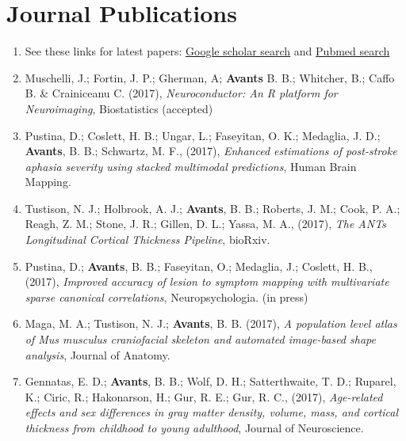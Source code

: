 \documentclass[11pt]{moderncv} %
\begin{document}
\section{Journal Publications} %
\begin{enumerate}
\item See these links for latest papers: \href{https://scholar.google.com/citations?hl=en&user=t4kkowgAAAAJ&view_op=list_works&sortby=pubdate}{Google scholar search} and \href{http://www.ncbi.nlm.nih.gov/pubmed?term=(\%22Avants\%20B\%22)\%20}{Pubmed  search}

\item Muschelli, J.; Fortin, J. P.; Gherman, A; \textbf{Avants} B. B.; Whitcher, B.; Caffo B. \& Crainiceanu C. (2017), \textit{Neuroconductor: An R platform for Neuroimaging}, Biostatistics (accepted)

\item Pustina, D.; Coslett, H. B.; Ungar, L.; Faseyitan, O. K.; Medaglia, J. D.; \textbf{Avants}, B. B.; Schwartz, M. F., (2017), \textit{Enhanced estimations of post-stroke aphasia severity using stacked multimodal predictions}, Human Brain Mapping.

\item Tustison, N. J.; Holbrook, A. J.; \textbf{Avants}, B. B.; Roberts, J. M.; Cook, P. A.; Reagh, Z. M.; Stone, J. R.; Gillen, D. L.; Yassa, M. A., (2017), \textit{The ANTs Longitudinal Cortical Thickness Pipeline}, bioRxiv.

\item Pustina, D.; \textbf{Avants}, B. B.; Faseyitan, O.; Medaglia, J.; Coslett, H. B., (2017), \textit{Improved accuracy of lesion to symptom mapping with multivariate sparse canonical correlations}, Neuropsychologia. (in press)

\item Maga, M. A.; Tustison, N. J.; \textbf{Avants}, B. B. (2017), \textit{A population level atlas of Mus musculus craniofacial skeleton and automated image-based shape analysis}, Journal of Anatomy.

\item Gennatas, E. D.; \textbf{Avants}, B. B.; Wolf, D. H.; Satterthwaite, T. D.; Ruparel, K.; Ciric, R.; Hakonarson, H.; Gur, R. E.; Gur, R. C., (2017), \textit{Age-related effects and sex differences in gray matter density, volume, mass, and cortical thickness from childhood to young adulthood}, Journal of Neuroscience.


\end{enumerate}
\end{document}
